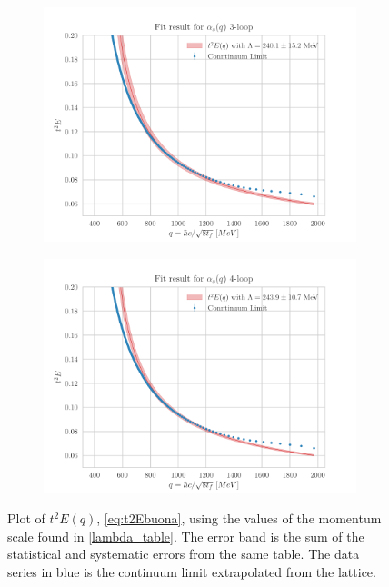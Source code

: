 \begin{figure}[hbt!]
    \begin{subfigure}{0.49\textwidth}
        \centering
        \includegraphics[width=1\textwidth]{results/End3.pdf}
    \end{subfigure}
    \begin{subfigure}{0.49\textwidth}
        \centering
        \includegraphics[width=1\textwidth]{results/End4.pdf}        
    \end{subfigure}
    \caption{Plot of $t^2E(q)$, \cref{eq:t2Ebuona}, using the values of the momentum scale found in \cref{lambda_table}. The error band is the sum of the statistical and systematic errors from the same table. The data series in blue is the continuum limit extrapolated from the lattice.}
    \label{fig:end}
\end{figure}

